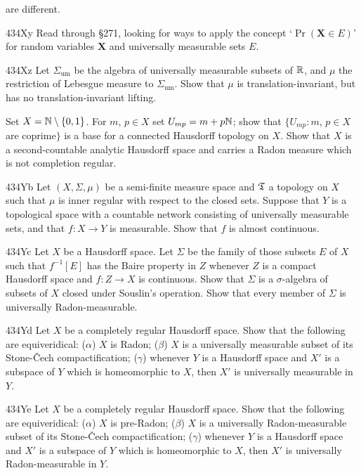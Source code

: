{\noindent are different.

\spheader 434Xy Read through \S271, looking for ways to apply the
concept `$\Pr(\pmb{X}\in E)$' for random variables $\pmb{X}$ and
universally measurable sets $E$.

\spheader 434Xz Let $\Sigma_{\text{um}}$ 
be the algebra of universally measurable 
subsets of $\Bbb R$, and $\mu$ the restriction of Lebesgue measure to
$\Sigma_{\text{um}}$.   
Show that $\mu$ is translation-invariant, but has no
translation-invariant lifting.   

Set $X=\Bbb N\setminus\{0,1\}$.   For $m$, $p\in X$ set
$U_{mp}=m+p\Bbb N$;  show that $\{U_{mp}:m$, $p\in X$ are coprime$\}$ is
a base for a connected Hausdorff topology on $X$.
   Show that $X$ is a second-countable analytic
Hausdorff space and carries a Radon measure which is not completion
regular.

\spheader 434Yb Let $(X,\Sigma,\mu)$ be a semi-finite measure space and
$\frak T$ a topology on $X$ such that $\mu$ is inner regular with
respect to the closed sets.   Suppose that $Y$ is a topological space
with a countable network consisting of universally measurable sets, and
that $f:X\to Y$ is measurable.   Show that $f$ is almost continuous.

\spheader 434Yc Let $X$ be a Hausdorff space.   Let $\Sigma$ be the
family of those subsets $E$ of $X$ such that $f^{-1}[E]$ has the Baire
property in $Z$ whenever $Z$ is a compact Hausdorff space and $f:Z\to X$
is continuous.   Show that $\Sigma$ is a $\sigma$-algebra of subsets of
$X$ closed under Souslin's operation.   Show that every member of
$\Sigma$ is universally Radon-measurable.

\spheader 434Yd Let $X$ be a completely regular Hausdorff space.   Show
that the following are equiveridical:  ($\alpha$) $X$ is Radon;
($\beta$) $X$ is a universally measurable subset of its
Stone-\v{C}ech compactification;  ($\gamma$) whenever $Y$ is a Hausdorff
space and $X'$ is a subspace of $Y$ which is homeomorphic to $X$, then
$X'$ is universally measurable in $Y$.

\spheader 434Ye Let $X$ be a completely regular Hausdorff space.   Show
that the following are equiveridical:  ($\alpha$) $X$ is pre-Radon;
($\beta$) $X$ is a universally Radon-measurable subset of its
Stone-\v{C}ech compactification;  ($\gamma$) whenever $Y$ is a Hausdorff
space and $X'$ is a subspace of $Y$ which is homeomorphic to $X$, then
$X'$ is universally Radon-measurable in $Y$.

}
